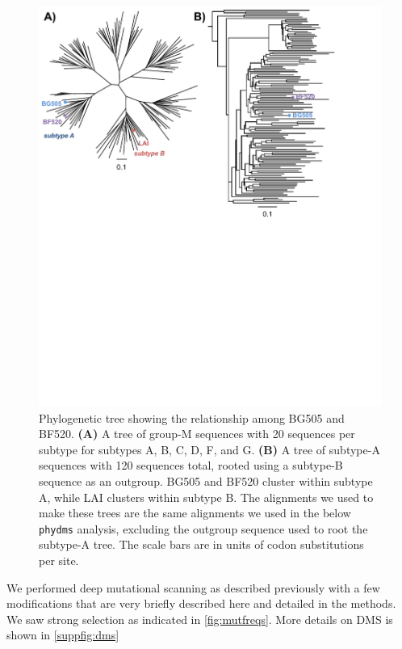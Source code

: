 \documentclass[9pt,lineno]{elife}
\begin{document}
\begin{figure}
\centerline{\includegraphics[width=5in]{figures/tree/tree}}
\caption{\label{fig:tree}
Phylogenetic tree showing the relationship among BG505 and BF520.
{\bf(A)} A tree of group-M sequences with 20 sequences per subtype for subtypes A, B, C, D, F, and G.
{\bf(B)} A tree of subtype-A sequences with 120 sequences total, rooted using a subtype-B sequence as an outgroup.
BG505 and BF520 cluster within subtype A, while LAI clusters within subtype B.
The alignments we used to make these trees are the same alignments we used in the below \texttt{phydms} analysis, excluding the outgroup sequence used to root the subtype-A tree.
The scale bars are in units of codon substitutions per site.
}
\end{figure}

We performed deep mutational scanning as described previously with a few modifications that are very briefly described here and detailed in the methods.
We saw strong selection as indicated in \ref{fig:mutfreqs}.
More details on DMS is shown in \ref{suppfig:dms}
\end{document}
